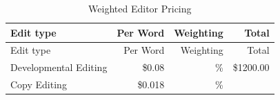 \documentclass[10pt,openany]{book}
\begin{document}
\begin{longtable}[]{@{}lrrr@{}}
\caption{Weighted Editor Pricing}\tabularnewline
\toprule
\begin{minipage}[b]{0.34\columnwidth}\raggedright
Edit type\strut
\end{minipage} & \begin{minipage}[b]{0.16\columnwidth}\raggedleft
Per Word\strut
\end{minipage} & \begin{minipage}[b]{0.16\columnwidth}\raggedleft
Weighting\strut
\end{minipage} & \begin{minipage}[b]{0.22\columnwidth}\raggedleft
Total\strut
\end{minipage}\tabularnewline
\midrule
\endfirsthead
\toprule
\begin{minipage}[b]{0.34\columnwidth}\raggedright
Edit type\strut
\end{minipage} & \begin{minipage}[b]{0.16\columnwidth}\raggedleft
Per Word\strut
\end{minipage} & \begin{minipage}[b]{0.16\columnwidth}\raggedleft
Weighting\strut
\end{minipage} & \begin{minipage}[b]{0.22\columnwidth}\raggedleft
Total\strut
\end{minipage}\tabularnewline
\midrule
\endhead
\begin{minipage}[t]{0.34\columnwidth}\raggedright
Developmental Editing\strut
\end{minipage} & \begin{minipage}[t]{0.16\columnwidth}\raggedleft
\$0.08\strut
\end{minipage} & \begin{minipage}[t]{0.16\columnwidth}\raggedleft
30\%\strut
\end{minipage} & \begin{minipage}[t]{0.22\columnwidth}\raggedleft
\$1200.00\strut
\end{minipage}\tabularnewline
\begin{minipage}[t]{0.34\columnwidth}\raggedright
Copy Editing\strut
\end{minipage} & \begin{minipage}[t]{0.16\columnwidth}\raggedleft
\$0.018\strut
\end{minipage} & \begin{minipage}[t]{0.16\columnwidth}\raggedleft
50\%\strut
\end{minipage} & \begin{minipage}[t]{0.22\columnwidth}\raggedleft

\end{minipage}
\end{longtable}
\end{document}
